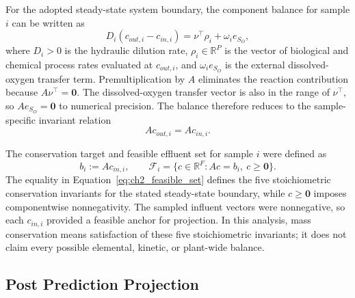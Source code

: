 \documentclass[12pt, twoside]{book}
\begin{document}
For the adopted steady-state system boundary, the component balance for sample \(i\) can be written as
\begin{equation}
\label{eq:ch2_steady_balance}
D_i(c_{out,i}-c_{in,i})=\nu^\top\rho_i+\omega_i e_{S_O},
\end{equation}
where \(D_i>0\) is the hydraulic dilution rate, \(\rho_i\in\mathbb{R}^{P}\) is the vector of biological and
chemical process rates evaluated at \(c_{out,i}\), and \(\omega_i e_{S_O}\) is the external dissolved-oxygen
transfer term. Premultiplication by \(A\) eliminates the reaction contribution because \(A\nu^\top=\mathbf{0}\).
The dissolved-oxygen transfer vector is also in the range of \(\nu^\top\), so \(Ae_{S_O}=\mathbf{0}\) to
numerical precision. The balance therefore reduces to the sample-specific invariant relation
\begin{equation}
\label{eq:ch2_invariant_balance}
Ac_{out,i}=Ac_{in,i}.
\end{equation}

The conservation target and feasible effluent set for sample \(i\) were defined as
\begin{equation}
\label{eq:ch2_feasible_set}
b_i:=Ac_{in,i},\qquad
\mathcal{F}_i=\{c\in\mathbb{R}^{F}:Ac=b_i,\ c\geq\mathbf{0}\}.
\end{equation}
The equality in Equation~\eqref{eq:ch2_feasible_set} defines the five stoichiometric conservation invariants
for the stated steady-state boundary, while \(c\geq\mathbf{0}\) imposes componentwise nonnegativity. The
sampled influent vectors were nonnegative, so each \(c_{in,i}\) provided a feasible anchor for projection. In
this analysis, mass conservation means satisfaction of these five stoichiometric invariants; it does not claim
every possible elemental, kinetic, or plant-wide balance.

\subsection{Post Prediction Projection}
\end{document}
